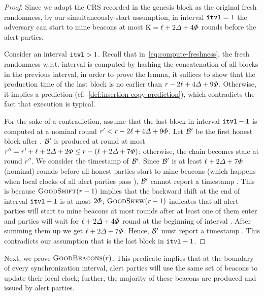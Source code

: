 \begin{proof}
    Since we adopt the CRS recorded in the genesis block as the original fresh randomness, by our simultaneously-start assumption, in interval $\mathtt{itvl} = 1$ the adversary can start to mine beacons at most $\mathrm{K} = \ell + 2\varDelta + 4\varPhi$ rounds before the alert parties.

    Consider an interval $\mathtt{itvl} > 1$. Recall that in~\cref{eq:compute-freshness}, the fresh randomness w.r.t. interval \interval is computed by hashing the concatenation of all blocks in the previous interval, in order to prove the lemma, it suffices to show that the production time of the last block is no earlier than  $r - 2\ell + 4\varDelta + 9\varPhi$.
    Otherwise, it implies a prediction (cf.~\cref{def:insertion-copy-prediction}), which contradicts the fact that execution is typical.

    For the sake of a contradiction, assume that the last block \block in interval $\mathtt{itvl} - 1$ is computed at a nominal round $r' < r - 2\ell + 4\varDelta + 9\varPhi$.
    Let $\mathcal{B}'$ be the first honest block after \block.
    $\mathcal{B}'$ is produced at round at most $r'' = r' + \ell + 2\varDelta + 2\varPhi \le r - (\ell + 2\varDelta + 7\varPhi)$; otherwise, the chain becomes stale at round $r''$.
    We consider the timestamp of $\mathcal{B}'$.
    Since $\mathcal{B}'$ is at least $\ell + 2\varDelta + 7\varPhi$ (nominal) rounds before all honest parties start to mine beacons (which happens when local clocks of all alert parties pass ), $\mathcal{B}'$ cannot report a timestamp \protocolTime{\interval}{\cdot}.
    This is because $\textsc{GoodShift}(r - 1)$ implies that the backward shift at the end of interval $\mathtt{itvl} - 1$ is at most $2\varPhi$; $\textsc{GoodSkew}(r - 1)$ indicates that all alert parties will start to mine beacons at most \maxskew rounds after at least one of them enter  and parties will wait for $\ell + 2\varDelta + 4\varPhi$ round at the beginning of interval \interval.
    After summing them up we get $\ell + 2\varDelta + 7\varPhi$.
    Hence, $\mathcal{B}'$ must report a timestamp .
    This contradicts our assumption that \block is the last block in $\mathtt{itvl} - 1$.
\end{proof}

Next, we prove $\textsc{GoodBeacons}(r)$.
%
This predicate implies that at the boundary of every synchronization interval, alert parties will use the same set of beacons to update their local clock; further, the majority of these beacons are produced and issued by alert parties.

